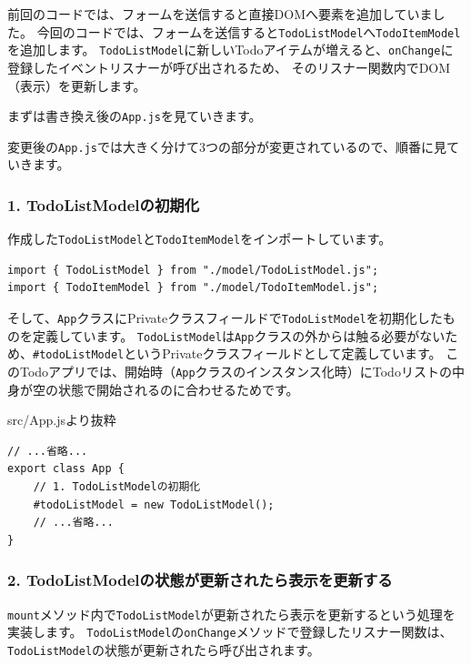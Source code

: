 前回のコードでは、フォームを送信すると直接DOMへ要素を追加していました。
今回のコードでは、フォームを送信すると\texttt{TodoListModel}へ\texttt{TodoItemModel}を追加します。
\texttt{TodoListModel}に新しいTodoアイテムが増えると、\texttt{onChange}に登録したイベントリスナーが呼び出されるため、
そのリスナー関数内でDOM（表示）を更新します。

まずは書き換え後の\texttt{App.js}を見ていきます。



変更後の\texttt{App.js}では大きく分けて3つの部分が変更されているので、順番に見ていきます。

\hypertarget{app-todolist-initialize}{%
\subsubsection{1. TodoListModelの初期化}\label{app-todolist-initialize}}

作成した\texttt{TodoListModel}と\texttt{TodoItemModel}をインポートしています。

\begin{lstlisting}
import { TodoListModel } from "./model/TodoListModel.js";
import { TodoItemModel } from "./model/TodoItemModel.js";
\end{lstlisting}

そして、\texttt{App}クラスにPrivateクラスフィールドで\texttt{TodoListModel}を初期化したものを定義しています。
\texttt{TodoListModel}は\texttt{App}クラスの外からは触る必要がないため、\texttt{\#todoListModel}というPrivateクラスフィールドとして定義しています。
このTodoアプリでは、開始時（\texttt{App}クラスのインスタンス化時）にTodoリストの中身が空の状態で開始されるのに合わせるためです。

\begin{listtitle}
src/App.jsより抜粋
\end{listtitle}
\begin{lstlisting}
// ...省略...
export class App {
    // 1. TodoListModelの初期化
    #todoListModel = new TodoListModel();
    // ...省略...
}
\end{lstlisting}
\listend

\hypertarget{app-todolist-onchange}{%
\subsubsection{2. TodoListModelの状態が更新されたら表示を更新する}\label{app-todolist-onchange}}

\texttt{mount}メソッド内で\texttt{TodoListModel}が更新されたら表示を更新するという処理を実装します。
\texttt{TodoListModel}の\texttt{onChange}メソッドで登録したリスナー関数は、\texttt{TodoListModel}の状態が更新されたら呼び出されます。


